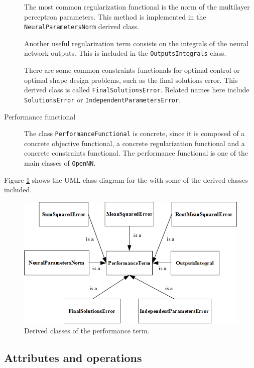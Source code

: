 \begin{description}
The most common regularization functional is the norm of the multilayer perceptron parameters. This method is implemented in the 
\lstinline"NeuralParametersNorm" derived class.

Another useful regularization term consists on the integrals of the neural network outputs. 
This is included in the \lstinline"OutputsIntegrals" class. 

There are some common constraints functionals for optimal control or optimal shape design problems, such as the final solutions error. 
This derived class is called \lstinline"FinalSolutionsError". Related names here include \lstinline"SolutionsError" or \lstinline"IndependentParametersError".

\item[Performance functional] The class \lstinline"PerformanceFunctional" is concrete, since it is composed of a concrete 
objective functional, a concrete regularization functional and a concrete constraints functional. 
The performance functional is one of the main classes of \texttt{OpenNN}.   

\end{description}

Figure \ref{PerformanceTermDerivedClassDiagram} shows the UML class diagram for the  with some of the derived classes included.

\begin{figure}[h!]
\centerline{
\includegraphics[width=1.1\textwidth]{performance_functional/performance_term_derived_diagram}
} \caption{Derived classes of the performance term.}\label{PerformanceTermDerivedClassDiagram}
\end{figure}

\subsection*{Attributes and operations}

